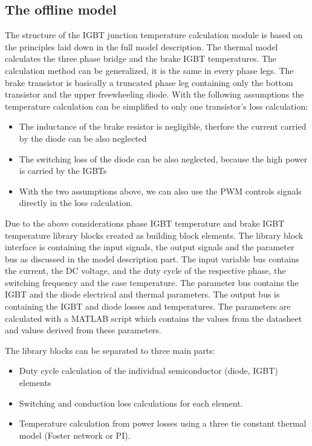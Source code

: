 \subsection{The offline model}
The structure of the IGBT junction temperature calculation module is based on the principles laid down in the full model description. The thermal model calculates the three phase bridge and the brake IGBT temperatures. The calculation method can be generalized, it is the same in every phase legs. The brake transistor is basically a truncated phase leg containing only the bottom transistor and the upper freewheeling diode. With the following assumptions the temperature calculation can be simplified to only one transistor's loss calculation:

\begin{itemize}
    \item The inductance of the brake resistor is negligible, therfore the current carried by the diode can be also neglected
    \item The switching loss of the diode can be also neglected, because the high power is carried by the IGBTs
    \item With the two assumptions above, we can also use the PWM controls signals directly in the loss calculation.
\end{itemize}

Due to the above considerations phase IGBT temperature and brake IGBT temperature library blocks created as building block elements. The library block interface is containing the input signals, the output signals and the parameter bus as discussed in the model description part.
The input variable bus contains the current, the DC voltage, and the duty cycle of the respective phase, the switching frequency and the case temperature. The parameter bus contains the IGBT and the diode electrical and thermal parameters. The output bus is containing the IGBT and diode losses and temperatures. The parameters are calculated with a MATLAB script which contains the values from the datasheet and values derived from these parameters.

The library blocks can be separated to three main parts:
\begin{itemize}
    \item Duty cycle calculation of the individual semiconductor (diode, IGBT) elements
    \item Switching and conduction loss calculations for each element.
    \item Temperature calculation from power losses using a three tie constant thermal model (Foster network or PI). 
\end{itemize}

